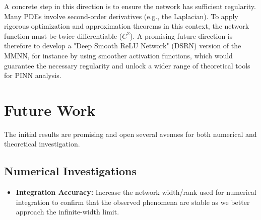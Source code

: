 \documentclass[a4paper]{article}
\begin{document}
A concrete step in this direction is to ensure the network has sufficient regularity. Many PDEs involve second-order derivatives (e.g., the Laplacian). To apply rigorous optimization and approximation theorems in this context, the network function must be twice-differentiable ($C^2$). A promising future direction is therefore to develop a "Deep Smooth ReLU Network" (DSRN) version of the MMNN, for instance by using smoother activation functions, which would guarantee the necessary regularity and unlock a wider range of theoretical tools for PINN analysis.

\section{Future Work}
The initial results are promising and open several avenues for both numerical and theoretical investigation.

\subsection{Numerical Investigations}
\begin{itemize}
    \item \textbf{Integration Accuracy:} Increase the network width/rank used for numerical integration to confirm that the observed phenomena are stable as we better approach the infinite-width limit.
\end{itemize}
\end{document}
